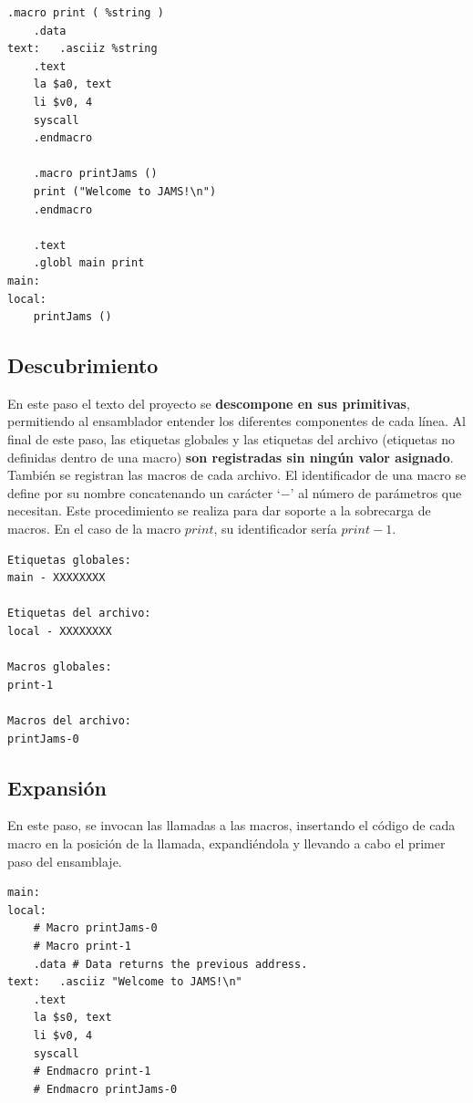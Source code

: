 \begin{lstlisting}[frame=single,label={lst:example.asm}]
    .macro print ( %string )
    .data
text:   .asciiz %string
    .text
    la $a0, text
    li $v0, 4
    syscall
    .endmacro

    .macro printJams ()
    print ("Welcome to JAMS!\n")
    .endmacro

    .text
    .globl main print
main:
local:
    printJams ()
\end{lstlisting}

\subsection{Descubrimiento}\label{subsec:descubrimiento}

En este paso el texto del proyecto se \textbf{descompone en sus primitivas},
permitiendo al ensamblador entender los diferentes componentes de cada línea.
Al final de este paso, las etiquetas globales y las etiquetas del archivo
(etiquetas no definidas dentro de una macro) \textbf{son registradas sin
ningún valor asignado}.
También se registran las macros de cada archivo.
El identificador de una macro se define por su nombre concatenando
un carácter `$-$' al número de parámetros que necesitan.
Este procedimiento se realiza para dar soporte a la sobrecarga de macros.
En el caso de la macro $print$, su identificador sería $print-1$.

\begin{lstlisting}[frame=single,label={lst:descubrimiento}]
Etiquetas globales:
main - XXXXXXXX

Etiquetas del archivo:
local - XXXXXXXX

Macros globales:
print-1

Macros del archivo:
printJams-0
\end{lstlisting}

\subsection{Expansión}\label{subsec:expansion}

En este paso, se invocan las llamadas a las macros,
insertando el código de cada macro en la posición de la llamada,
expandiéndola y llevando a cabo el primer paso del ensamblaje.

\begin{lstlisting}[frame=single,label={lst:expansion}]
main:
local:
    # Macro printJams-0
    # Macro print-1
    .data # Data returns the previous address.
text:   .asciiz "Welcome to JAMS!\n"
    .text
    la $s0, text
    li $v0, 4
    syscall
    # Endmacro print-1
    # Endmacro printJams-0
\end{lstlisting}

